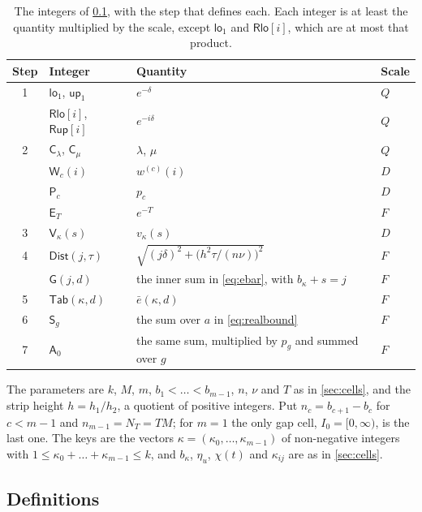 \begin{table}[ht]
\centering
\caption{The integers of \cref{sec:recipe}, with the step that defines each. Each integer is at least the quantity multiplied by the scale, except $\mathsf{lo}_1$ and $\mathsf{Rlo}[i]$, which are at most that product.}
\label{tab:integers}
\begin{tabular}{@{}clll@{}}
\toprule
Step & Integer & Quantity & Scale \\
\midrule
1 & $\mathsf{lo}_1$, $\mathsf{up}_1$ & $e^{-\delta}$ & $Q$ \\
  & $\mathsf{Rlo}[i]$, $\mathsf{Rup}[i]$ & $e^{-i\delta}$ & $Q$ \\
2 & $\mathsf{C}_\lambda$, $\mathsf{C}_\mu$ & $\lambda$, $\mu$ & $Q$ \\
  & $\mathsf{W}_c(i)$ & $w^{(c)}(i)$ & $D$ \\
  & $\mathsf{P}_c$ & $p_c$ & $D$ \\
  & $\mathsf{E}_T$ & $e^{-T}$ & $F$ \\
3 & $\mathsf{V}_\kappa(s)$ & $v_\kappa(s)$ & $D$ \\
4 & $\mathsf{Dist}(j,\tau)$ & $\sqrt{(j\delta)^2+\bigl(h^2\tau/(n\nu)\bigr)^2}$ & $F$ \\
  & $\mathsf{G}(j,d)$ & the inner sum in \eqref{eq:ebar}, with $b_\kappa+s=j$ & $F$ \\
5 & $\mathsf{Tab}(\kappa,d)$ & $\bar e(\kappa,d)$ & $F$ \\
6 & $\mathsf{S}_g$ & the sum over $a$ in \eqref{eq:realbound} & $F$ \\
7 & $\mathsf{A}_0$ & the same sum, multiplied by $p_g$ and summed over $g$ & $F$ \\
\bottomrule
\end{tabular}
\end{table}

The parameters are $k$, $M$, $m$, $b_1<\dots<b_{m-1}$, $n$, $\nu$ and $T$ as in \cref{sec:cells}, and the strip height $h=h_1/h_2$, a quotient of positive integers. Put $n_c=b_{c+1}-b_c$ for $c<m-1$ and $n_{m-1}=N_T=TM$; for $m=1$ the only gap cell, $I_0=[0,\infty)$, is the last one. The keys are the vectors $\kappa=(\kappa_0,\dots,\kappa_{m-1})$ of non-negative integers with $1\le\kappa_0+\dots+\kappa_{m-1}\le k$, and $b_\kappa$, $\eta_u$, $\chi(t)$ and $\kappa_{ij}$ are as in \cref{sec:cells}.

\subsection{Definitions}\label{sec:recipe}

